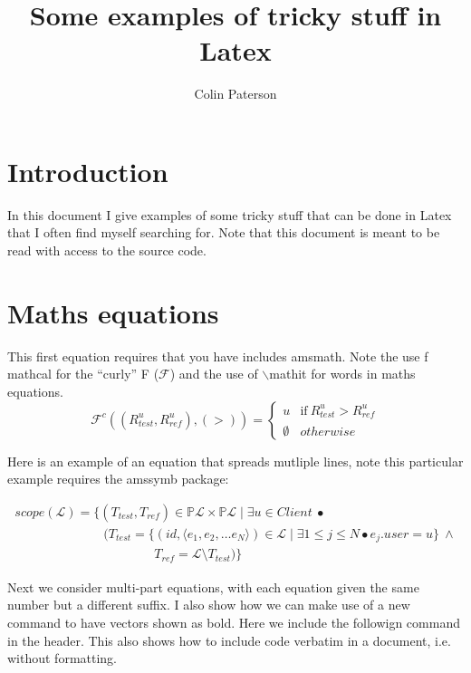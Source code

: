 \documentclass{article}
\title{Some examples of tricky stuff in Latex}
\author{Colin Paterson }
\begin{document}
\maketitle

\section{Introduction}

In this document I give examples of some tricky stuff that can be done in Latex that I often find myself searching for. Note that this document is meant to be read with access to the source code.


\section{Maths equations}

This first equation requires that you have includes amsmath. Note the use f mathcal for the ``curly'' F ($\mathcal{F}$) and the use of $\backslash$\textsf{mathit} for words in maths equations.
\begin{equation}
\mathcal{F}^c((R^u_\mathit{test}, R^u_\mathit{ref}), (>)) = \begin{cases}
 {u} & \text{if}~ R^u_\mathit{test}>R^u_\mathit{ref}\\
  \emptyset & otherwise
\end{cases}
\end{equation}


Here is an example of an equation that spreads mutliple lines, note this particular example requires the amssymb package:

\begin{equation}
\begin{array}{l}
\mathit{scope}(\mathcal{L}) = \bigl\{(T_\mathit{test},T_\mathit{ref})\in \mathbb{P}\mathcal{L}\!\times\! \mathbb{P}\mathcal{L} \mid
\exists u\!\in\! \mathit{Client}\: \bullet\\
\qquad\qquad\qquad\quad \bigl(T_\mathit{test} = \{ (\mathit{id},\langle e_1, e_2, \ldots e_N \rangle)\!\in\! \mathcal{L} \mid \exists 1\leq j\leq N \bullet e_j.\mathit{user}=u\} \: \wedge \\
\qquad\qquad\qquad\qquad\qquad\quad T_\mathit{ref} = \mathcal{L}\setminus T_\mathit{test}\bigr)\bigr\}
\end{array}
\end{equation}

Next we consider multi-part equations, with each equation given the same number but a different suffix. I also show how we can make use of a new command to have vectors shown as bold. Here we include the followign command in the header. This also shows how to include code verbatim in a document, i.e. without formatting.
\end{document}
